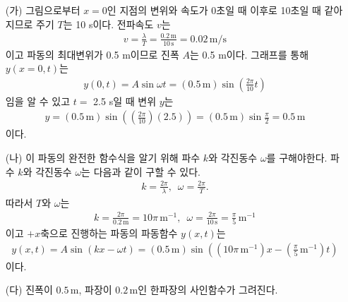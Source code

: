 \documentclass[floatfix,nofootinbib,superscriptaddress,fleqn]{revtex4-2}
\begin{document}
\vspace{0.5cm} 
\begin{itemize}
  \item[(가)]
  그림으로부터 $ x=0$인 지점의 변위와 속도가 0초일 때 이후로 10초일 때 같아지므로 주기 $T$는 10 s이다.
  전파속도 $v$는 
  \begin{align}
    v = \frac{\lambda}{T} = \frac{0.2\,\mathrm{m}}{10\,\mathrm{s}}=0.02\,\mathrm{m/s}
  \end{align}
  이고 파동의 최대변위가 0.5 m이므로 진폭 $A$는 0.5 m이다. 그래프를 통해 $y(x=0,t)$는
  \begin{align}
    y(0,t) = A\sin\omega t = (0.5\,\mathrm{m})\sin\left(\frac{2\pi}{10}t\right)
  \end{align}
  임을 알 수 있고 $t=$ 2.5 s일 때 변위 $y$는
  \begin{align}
    y = (0.5\,\mathrm{m})\sin\left(\left(\frac{2\pi}{10}\right)(2.5)\right)
    =(0.5\,\mathrm{m})\sin\frac{\pi}{2} = 0.5\,\mathrm{m}
  \end{align}
  이다.
  \item[(나)]
  이 파동의 완전한 함수식을 알기 위해 파수 $k$와 각진동수 $\omega$를 구해야한다. 
  파수 $k$와 각진동수 $\omega$는 다음과 같이 구할 수 있다.
  \begin{align}
    k = \frac{2\pi}{\lambda},\,\,\, \omega = \frac{2\pi}{T}.
  \end{align}
  따라서 $T$와 $\omega$는
  \begin{align}
    k = \frac{2\pi}{0.2\,\mathrm{m}}=10\pi\,\mathrm{m^{-1}},\,\,\,
    \omega = \frac{2\pi}{10\,\mathrm{s}} = \frac{\pi}{5}\,\mathrm{m^{-1}}
  \end{align}
  이고 $+x$축으로 진행하는 파동의 파동함수 $y(x,t)$는
  \begin{align}
    y(x,t) = A\sin(kx-\omega t)
    = (0.5\,\mathrm{m})\sin\left((10\pi\,\mathrm{m^{-1}})x
    -(\frac{\pi}{5}\,\mathrm{m^{-1}}) t\right)
  \end{align}
  이다.
  \item[(다)]
  진폭이 $0.5\,\mathrm{m}$, 파장이 $0.2\,\mathrm{m}$인 한파장의 사인함수가 그려진다.
\end{itemize}
\vspace{0.5cm}
 
\end{document}
